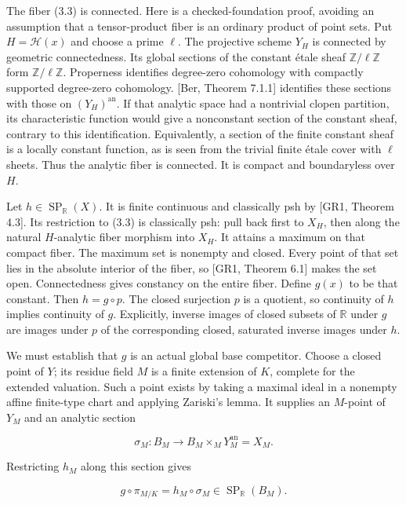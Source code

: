 \documentclass[11pt,a4paper]{article}
\begin{document}
The fiber (3.3) is connected. Here is a checked-foundation proof, avoiding an assumption that a tensor-product fiber is an ordinary product of point sets. Put \(H=\mathcal H(x)\) and choose a prime \(\ell\). The projective scheme \(Y_H\) is connected by geometric connectedness. Its global sections of the constant étale sheaf \(\mathbb Z/\ell\mathbb Z\) form \(\mathbb Z/\ell\mathbb Z\). Properness identifies degree-zero cohomology with compactly supported degree-zero cohomology. [Ber, Theorem 7.1.1] identifies these sections with those on \((Y_H)^{\mathrm{an}}\). If that analytic space had a nontrivial clopen partition, its characteristic function would give a nonconstant section of the constant sheaf, contrary to this identification. Equivalently, a section of the finite constant sheaf is a locally constant function, as is seen from the trivial finite étale cover with \(\ell\) sheets. Thus the analytic fiber is connected. It is compact and boundaryless over \(H\).

Let \(h\in\operatorname{SP}_{\mathbb R}(X)\). It is finite continuous and classically psh by [GR1, Theorem 4.3]. Its restriction to (3.3) is classically psh: pull back first to \(X_H\), then along the natural \(H\)-analytic fiber morphism into \(X_H\). It attains a maximum on that compact fiber. The maximum set is nonempty and closed. Every point of that set lies in the absolute interior of the fiber, so [GR1, Theorem 6.1] makes the set open. Connectedness gives constancy on the entire fiber. Define \(g(x)\) to be that constant. Then \(h=g\circ p\). The closed surjection \(p\) is a quotient, so continuity of \(h\) implies continuity of \(g\). Explicitly, inverse images of closed subsets of \(\mathbb R\) under \(g\) are images under \(p\) of the corresponding closed, saturated inverse images under \(h\).

We must establish that \(g\) is an actual global base competitor. Choose a closed point of \(Y\); its residue field \(M\) is a finite extension of \(K\), complete for the extended valuation. Such a point exists by taking a maximal ideal in a nonempty affine finite-type chart and applying Zariski's lemma. It supplies an \(M\)-point of \(Y_M\) and an analytic section

\[
\sigma_M:B_M\longrightarrow B_M\times_M Y_M^{\mathrm{an}}=X_M.
\]

Restricting \(h_M\) along this section gives

\[
g\circ\pi_{M/K}=h_M\circ\sigma_M
\in\operatorname{SP}_{\mathbb R}(B_M). \tag{3.4}
\]
\end{document}
